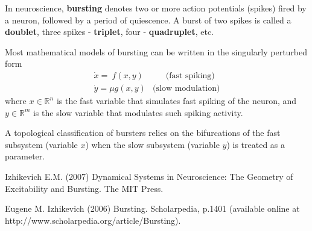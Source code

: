 \documentclass[12pt]{article}
\begin{document}

In neuroscience, {\bf bursting} denotes two or more action potentials (spikes) fired by a neuron, followed by a period of quiescence. A burst of two spikes is called a {\bf doublet}, three spikes - {\bf triplet}, four - {\bf quadruplet}, etc. 

Most mathematical models of bursting can be written in the singularly perturbed form
\[
\begin{matrix} 
\dot{x}  = \  f(x, y) & \ \ \ \ \ \ \ \mbox{(fast spiking)} \\ 
\dot{y}  =  \mu g(x, y) & \mbox{(slow modulation)}
\end{matrix}
\]
where $x \in {\mathbb R}^n$ is the fast variable that simulates fast spiking of the neuron, and $y \in {\mathbb R}^m$ is the slow variable that modulates such spiking activity.

A topological classification of bursters relies on the bifurcations of the fast subsystem (variable $x$) when the slow subsystem (variable $y$) is treated as a parameter.

\begin{thebibliography}{20}

 Izhikevich E.M. (2007) Dynamical Systems in Neuroscience: The Geometry of Excitability and Bursting. The MIT Press.

 Eugene M. Izhikevich (2006) Bursting. Scholarpedia, p.1401 (available online at http://www.scholarpedia.org/article/Bursting).

\end{thebibliography}


 
\end{document}
